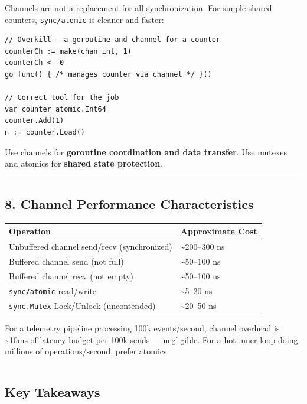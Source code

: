 \documentclass[11pt,a4paper,oneside]{book}
\begin{document}
Channels are not a replacement for all synchronization. For simple
shared counters, \texttt{sync/atomic} is cleaner and faster:

\begin{verbatim}
// Overkill — a goroutine and channel for a counter
counterCh := make(chan int, 1)
counterCh <- 0
go func() { /* manages counter via channel */ }()

// Correct tool for the job
var counter atomic.Int64
counter.Add(1)
n := counter.Load()
\end{verbatim}

Use channels for \textbf{goroutine coordination and data transfer}. Use
mutexes and atomics for \textbf{shared state protection}.

\begin{center}\rule{0.5\linewidth}{0.5pt}\end{center}

\subsection{8. Channel Performance
Characteristics}

\begin{longtable}[]{@{}ll@{}}
\toprule()
Operation & Approximate Cost \\
\midrule()
\endhead
Unbuffered channel send/recv (synchronized) & \textasciitilde200--300
ns \\
Buffered channel send (not full) & \textasciitilde50--100 ns \\
Buffered channel recv (not empty) & \textasciitilde50--100 ns \\
\texttt{sync/atomic} read/write & \textasciitilde5--20 ns \\
\texttt{sync.Mutex} Lock/Unlock (uncontended) & \textasciitilde20--50
ns \\
\bottomrule()
\end{longtable}

For a telemetry pipeline processing 100k events/second, channel overhead
is \textasciitilde10ms of latency budget per 100k sends --- negligible.
For a hot inner loop doing millions of operations/second, prefer
atomics.

\begin{center}\rule{0.5\linewidth}{0.5pt}\end{center}

\subsection{Key Takeaways}
\end{document}
